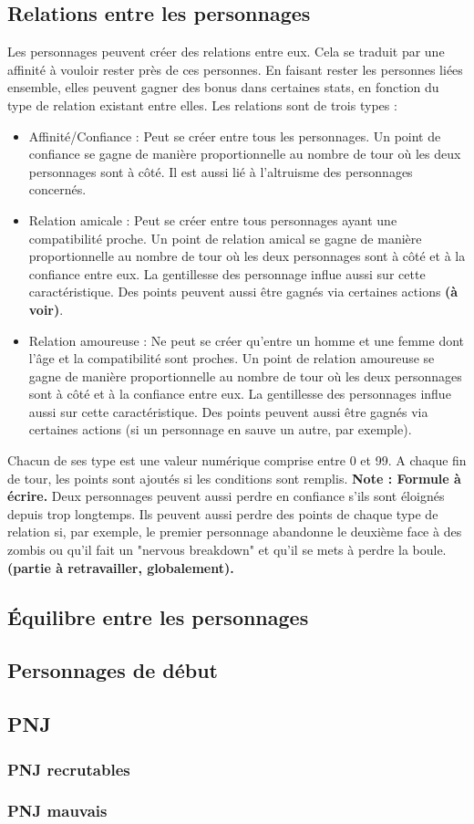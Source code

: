 \subsection{Relations entre les personnages}
Les personnages peuvent créer des relations entre eux. Cela se traduit par une affinité à vouloir rester près de ces personnes. En faisant rester les personnes liées ensemble, elles peuvent gagner des bonus dans certaines stats, en fonction du type de relation existant entre elles. Les relations sont de trois types : 
\begin{itemize}
  \item Affinité/Confiance : Peut se créer entre tous les personnages. Un point de confiance se gagne de manière proportionnelle au nombre de tour où les deux personnages sont à côté. Il est aussi lié à l'altruisme des personnages concernés.
  \item Relation amicale : Peut se créer entre tous personnages ayant une compatibilité proche. Un point de relation amical se gagne de manière proportionnelle au nombre de tour où les deux personnages sont à côté et à la confiance entre eux. La gentillesse des personnage influe aussi sur cette caractéristique. Des points peuvent aussi être gagnés via certaines actions \textbf{(à voir)}. 
    \item Relation amoureuse : Ne peut se créer qu'entre un homme et une femme dont l'âge et la compatibilité sont proches. Un point de relation amoureuse se gagne de manière proportionnelle au nombre de tour où les deux personnages sont à côté et à la confiance entre eux. La gentillesse des personnages influe aussi sur cette caractéristique. Des points peuvent aussi être gagnés via certaines actions (si un personnage en sauve un autre, par exemple). 
\end{itemize}
Chacun de ses type est une valeur numérique comprise entre 0 et 99. A chaque fin de tour, les points sont ajoutés si les conditions sont remplis. \textbf{Note : Formule à écrire.} Deux personnages peuvent aussi perdre en confiance s'ils sont éloignés depuis trop longtemps. Ils peuvent aussi perdre des points de chaque type de relation si, par exemple, le premier personnage abandonne le deuxième face à des zombis ou qu'il fait un "nervous breakdown" et qu'il se mets à perdre la boule. \textbf{(partie à retravailler, globalement).}
\subsection{Équilibre entre les personnages}
\subsection{Personnages de début}
\subsection{PNJ}
\subsubsection{PNJ recrutables}
\subsubsection{PNJ mauvais}
